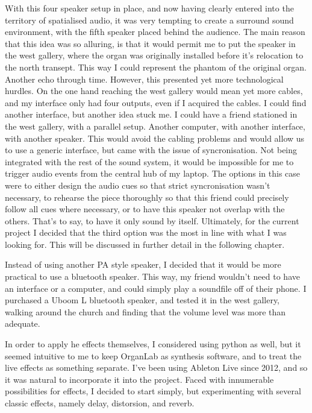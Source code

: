 \documentclass[12pt,twoside,maitrise]{dms_ks}
\theoremstyle{definition}
\begin{document}
With this four speaker setup in place, and now having clearly entered into the territory of spatialised audio, it was very tempting to create a surround sound environment, with the fifth speaker placed behind the audience. 
The main reason that this idea was so alluring, is that it would permit me to put the speaker in the west gallery, where the organ was originally installed before it's relocation to the north transept. 
This way I could represent the phantom of the original organ. 
Another echo through time. 
However, this presented yet more technological hurdles. 
On the one hand reaching the west gallery would mean yet more cables, and my interface only had four outputs, even if I acquired the cables. 
I could find another interface, but another idea stuck me. 
I could have a friend stationed in the west gallery, with a parallel setup. 
Another computer, with another interface, with another speaker. 
This would avoid the cabling problems and would allow us to use a generic interface, but came with the issue of syncronisation. 
Not being integrated with the rest of the sound system, it would be impossible for me to trigger audio events from the central hub of my laptop. 
The options in this case were to either design the audio cues so that strict syncronisation wasn't necessary, to rehearse the piece thoroughly so that this friend could precisely follow all cues where necessary, or to have this speaker not overlap with the others. 
That's to say, to have it only sound by itself. 
Ultimately, for the current project I decided that the third option was the most in line with what I was looking for. 
This will be discussed in further detail in the following chapter. 

Instead of using another PA style speaker, I decided that it would be more practical to use a bluetooth speaker. 
This way, my friend wouldn't need to have an interface or a computer, and could simply play a soundfile off of their phone. 
I purchased a Uboom L bluetooth speaker, and tested it in the west gallery, walking around the church and finding that the volume level was more than adequate. 


In order to apply he effects themselves, I considered using python as well, but it seemed intuitive to me to keep OrganLab as synthesis software, and to treat the live effects as something separate. 
I've been using Ableton Live since 2012, and so it was natural to incorporate it into the project. 
Faced with innumerable possibilities for effects, I decided to start simply, but experimenting with several classic effects, namely delay, distorsion, and reverb. 
\end{document}

